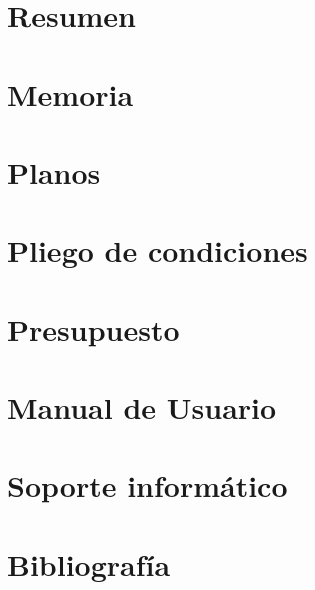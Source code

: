 \newpage
\newpage

\clearemptydoublepage
\chapter{Resumen}
\newpage
\clearemptydoublepage

\clearemptydoublepage

\chapter{Memoria}
\newpage
\clearemptydoublepage

\clearemptydoublepage

\chapter{Planos}
\newpage
\clearemptydoublepage

\clearemptydoublepage

\chapter{Pliego de condiciones}
\newpage
\clearemptydoublepage

\clearemptydoublepage

\chapter{Presupuesto}
\newpage
\clearemptydoublepage

\clearemptydoublepage

\chapter{Manual de Usuario}
\newpage
\clearemptydoublepage

\clearemptydoublepage

\chapter{Soporte informático}
\newpage
\clearemptydoublepage

\clearemptydoublepage

%

\chapter{Bibliografía}
\newpage
\clearemptydoublepage




%
%
\clearemptydoublepage

\printindex


